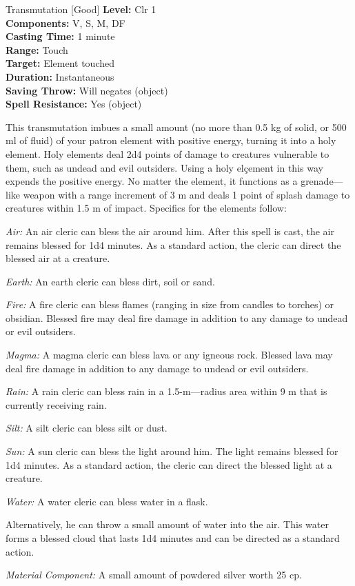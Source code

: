 {Transmutation [Good]}
{
	\textbf{Level:}
	Clr 1\\
	\textbf{Components:}
	V, S, M, DF\\
	\textbf{Casting Time:}
	1 minute\\
	\textbf{Range:}
	Touch\\
	\textbf{Target:}
	Element touched\\
	\textbf{Duration:}
	Instantaneous\\
	\textbf{Saving Throw:}
	Will negates (object)\\
	\textbf{Spell Resistance:}
	Yes (object)\\
}
{
	This transmutation imbues a small amount (no more than 0.5 kg of solid, or 500 ml of fluid) of your patron element with positive energy, turning it into a holy element. Holy elements deal 2d4 points of damage to creatures vulnerable to them, such as undead and evil outsiders. Using a holy elçement in this way expends the positive energy. No matter the element, it functions as a grenade---like weapon with a range increment of 3 m and deals 1 point of splash damage to creatures within 1.5 m of impact. Specifics for the elements follow:

	\textit{Air:} An air cleric can bless the air around him. After this spell is cast, the air remains blessed for 1d4 minutes. As a standard action, the cleric can direct the blessed air at a creature.

	\textit{Earth:} An earth cleric can bless dirt, soil or sand.

	\textit{Fire:} A fire cleric can bless flames (ranging in size from candles to torches) or obsidian. Blessed fire may deal fire damage in addition to any damage to undead or evil outsiders.

	\textit{Magma:} A magma cleric can bless lava or any igneous rock. Blessed lava may deal fire damage in addition to any damage to undead or evil outsiders.

	\textit{Rain:} A rain cleric can bless rain in a 1.5-m---radius area within 9 m that is currently receiving rain.

	\textit{Silt:} A silt cleric can bless silt or dust.

	\textit{Sun:} A sun cleric can bless the light around him. The light remains blessed for 1d4 minutes. As a standard action, the cleric can direct the blessed light at a creature.

	\textit{Water:} A water cleric can bless water in a flask.

	Alternatively, he can throw a small amount of water into the air. This water forms a blessed cloud that lasts 1d4 minutes and can be directed as a standard action.

	\textit{Material Component:} A small amount of powdered silver worth 25 cp.
}

